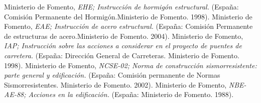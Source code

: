 


 Ministerio de Fomento,
{\it EHE; Instrucción de hormigón estructural.} (España: Comisión Permanente del Hormigón.Ministerio de Fomento. 1998).
 Ministerio de Fomento,
{\it EAE; Instrucción de acero estructural.} (España: Comisión Permanente de estructuras de acero.Ministerio de Fomento. 2004).
 Ministerio de Fomento,
{\it IAP; Instrucción sobre las acciones a considerar en el proyecto de puentes de carretera.} (España: Dirección General de Carreteras. Ministerio de Fomento. 1998).
 Ministerio de Fomento,
{\it NCSE-02; Norma de construcción sismorresistente: parte general y edificación.} (España: Comisión permanente de Normas Sismorresistentes. Ministerio de Fomento. 2002).
 Ministerio de Fomento,
{\it NBE-AE-88; Acciones en la edificación.} (España: Ministerio de Fomento. 1988).
